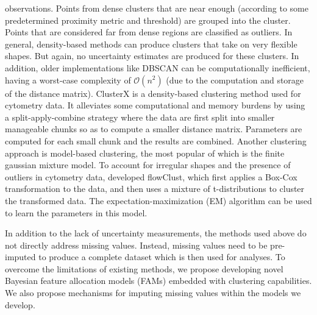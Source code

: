 \documentclass[12pt,]{article}
\begin{document}
observations. Points from dense clusters that are near enough (according to
some predetermined proximity metric and threshold) are grouped into the
cluster. Points that are considered far from dense regions are classified as
outliers. In general, density-based methods can produce clusters that take on
very flexible shapes. But again, no uncertainty estimates are produced for
these clusters. In addition, older implementations like DBSCAN can be
computationally inefficient, having a worst-case complexity of
$\mathcal{O}(n^2)$ (due to the computation and storage of the distance matrix). 
ClusterX \citep{chen2016cytofkit} is a density-based clustering method used for
cytometry data. It alleviates some computational and memory burdens by using a
split-apply-combine strategy where the data are first split into smaller 
manageable chunks so as to compute a smaller distance matrix. Parameters
are computed for each small chunk and the results are combined. 
%
Another clustering approach is model-based clustering, the most popular of
which is the finite gaussian mixture model. To account for irregular shapes and
the presence of outliers in cytometry data, \cite{lo2009flowclust} developed
flowClust, which first applies a Box-Cox transformation to the data, and then
uses a mixture of t-distributions to cluster the transformed data.  The
expectation-maximization (EM) algorithm \citep{dempster1997maximum} can be used
to learn the parameters in this model.
% 

In addition to the lack of uncertainty measurements, the methods used above do
not directly address missing values. Instead, missing values need to be
pre-imputed to produce a complete dataset which is then used for analyses.
%
To overcome the limitations of existing methods, we propose developing novel
Bayesian feature allocation models (FAMs) embedded with clustering
capabilities. We also propose mechanisms for imputing missing values within the
models we develop.
\end{document}
